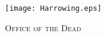 \fancyhead[RE,LO]{}
\fancyhead[RO,LE]{}
\fancyhead[C]{}
\thispagestyle{empty}
{}
  \begin{center}
   \texttt{[image: Harrowing.eps]}
   \par
   \vspace{2ex}
   	\textsc{\Huge{Office of the Dead}}
   \end{center}